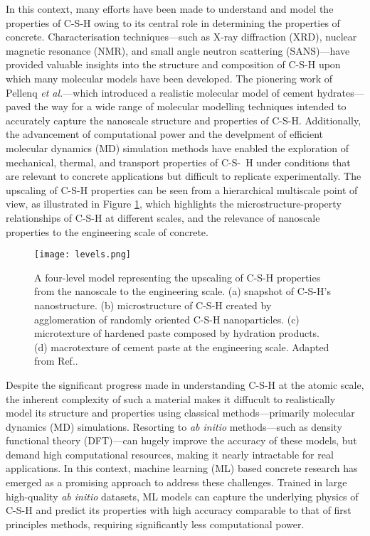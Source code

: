 In this context, many efforts have been made to understand and model the properties of C-S-H owing to its central role in determining the properties of concrete\supercite{Ji2012,Papatzani2015,Qomi2020}. Characterisation techniques---such as X-ray diffraction (XRD)\supercite{Allen2007, Houston2009,Oh2012}, nuclear magnetic resonance (NMR)\supercite{Foley2012,Maddalena2019}, and small angle neutron scattering (SANS)---have provided valuable insights into the structure and composition of C-S-H upon which many molecular models have been developed. The pionering work of Pellenq \emph{et al.}\supercite{Pellenq2009}---which introduced a realistic molecular model of cement hydrates---paved the way for a wide range of molecular modelling techniques\supercite{AbdolhosseiniQomi2014,Richardson2014,Bauchy2014,Kovacevic2016, KunhiMohamed2018} intended to accurately capture the nanoscale structure and properties of C-S-H. Additionally, the advancement of computational power and the develpment of efficient molecular dynamics (MD) simulation methods have enabled the exploration of mechanical, thermal, and transport properties of C-S-~H\supercite{
AbdolhosseiniQomi2015, Bahraq2022, Cho2020, Barbhuiya2023} under conditions that are relevant to concrete applications but difficult to replicate experimentally. The upscaling of C-S-H properties can be seen from a hierarchical multiscale point of view, as illustrated in Figure \ref{fig:figure1}, which highlights the microstructure-property relationships of C-S-H at different scales, and the relevance of nanoscale properties to the engineering scale of concrete.
\begin{figure}[H]
    \centering
    \texttt{[image: levels.png]}
    \caption{A four-level model representing the upscaling of C-S-H properties from the nanoscale to the engineering scale. (a) snapshot of C-S-H's nanostructure. (b) microstructure of C-S-H created by agglomeration of randomly oriented C-S-H nanoparticles. (c) microtexture of hardened paste composed by hydration products. (d) macrotexture of cement paste at the engineering scale. Adapted from Ref.\supercite{AbdolhosseiniQomi2015}.}
    \label{fig:figure1}
\end{figure}

Despite the significant progress made in understanding C-S-H at the atomic scale, the inherent complexity of such a material makes it diffucult to realistically model its structure and properties using classical methods---primarily molecular dynamics (MD) simulations. Resorting to \emph{ab initio} methods---such as density functional theory (DFT)---can hugely improve the accuracy of these models, but demand high computational resources, making it nearly intractable for real applications\supercite{zotero-item-16}. In this context, machine learning (ML) based concrete research has emerged as a promising approach to address these challenges\supercite{zotero-item-16, Kobayashi2021, Zhu2024}. Trained in large high-quality \emph{ab initio} datasets, ML models can capture the underlying physics of C-S-H and predict its properties with high accuracy comparable to that of first principles methods, requiring significantly less computational power. 


